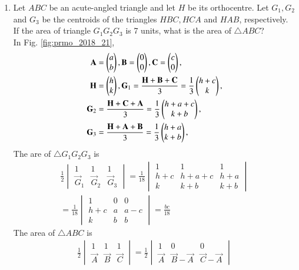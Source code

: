 \documentclass[journal,12pt,twocolumn]{IEEEtran}
\begin{document}
\begin{enumerate}[label=\arabic*]
\item  Let $ABC$ be an acute-angled triangle and let $H$ be its orthocentre. Let $G_1, G_2$ and $G_3$ be the centroids of the triangles $HBC, HCA$ and $HAB$, respectively. If the area of triangle $G_1G_2G_3$ is 7 units, what is the area of $\triangle ABC$?
\\
\solution In Fig. \eqref{fig:prmo_2018_21},
\begin{align}
\mathbf{A} &= \begin{pmatrix}a\\b\end{pmatrix},
\mathbf{B} = \begin{pmatrix}0\\0\end{pmatrix},
\mathbf{C} = \begin{pmatrix}c\\0\end{pmatrix},
\\
\mathbf{H} &= \begin{pmatrix}h\\k\end{pmatrix},
\mathbf{G}_1 = \frac{\mathbf{H}+\mathbf{B}+\mathbf{C}}{3}=\frac{1}{3}\begin{pmatrix}h+c\\k\end{pmatrix},
\\
\mathbf{G}_2 &= \frac{\mathbf{H}+\mathbf{C}+\mathbf{A}}{3}=\frac{1}{3}\begin{pmatrix}h+a+c\\k+b\end{pmatrix},
\\
\mathbf{G}_3 &= \frac{\mathbf{H}+\mathbf{A}+\mathbf{B}}{3}=\frac{1}{3}\begin{pmatrix}h+a\\k+b\end{pmatrix},
\end{align}
%
The are of $\triangle G_1G_2G_3$ is
\begin{align}
\frac{1}{2}
\begin{vmatrix}
1 & 1 & 1
\\
\vec{G}_1 &
\vec{G}_2 &
\vec{G}_3 
\end{vmatrix}
=
\frac{1}{18}
\begin{vmatrix}
1 & 1 & 1
\\
h+c & h+a+c & h+a
\\
k & k+b & k+b
\end{vmatrix}
\\
=
\frac{1}{18}
\begin{vmatrix}
1 & 0 & 0
\\
h+c & a & a-c
\\
k & b & b
\end{vmatrix}
=\frac{bc}{18}
\end{align}
%
The area of $\triangle ABC$ is
\begin{align}
\frac{1}{2}
\begin{vmatrix}
1 & 1 & 1
\\
\vec{A} & \vec{B} & \vec{C}
\end{vmatrix}
=
\frac{1}{2}
\begin{vmatrix}
1 & 0 & 0
\\
\vec{A} & \vec{B}-\vec{A} & \vec{C}-\vec{A}
\end{vmatrix}

\end{align}
\end{enumerate}
\end{document}
